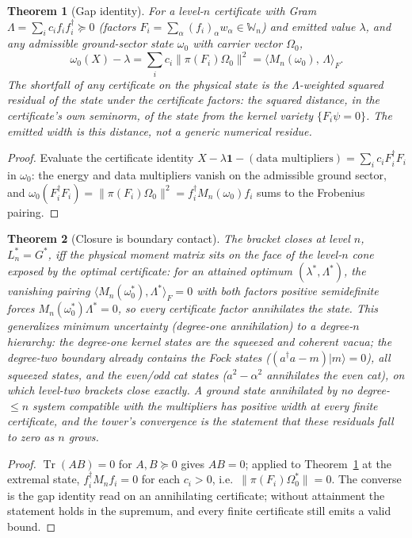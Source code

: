 \documentclass[11pt]{article}
\newtheorem{theorem}{Theorem}[section]
\theoremstyle{definition}
\theoremstyle{remark}
\newcommand{\Tr}{\operatorname{Tr}}
\newcommand{\W}{\mathbb{W}}
\begin{document}
\begin{theorem}[Gap identity]\label{thm:gapid}
For a level-$n$ certificate with Gram $\Lambda = \sum_i c_i f_i f_i^\dagger
\succeq 0$ (factors $F_i = \sum_\alpha (f_i)_\alpha w_\alpha \in \W_n$) and
emitted value $\lambda$, and any admissible ground-sector state $\omega_0$
with carrier vector $\Omega_0$,
\[
\omega_0(X) - \lambda = \sum_i c_i \|\pi(F_i)\Omega_0\|^2
= \langle M_n(\omega_0),\, \Lambda\rangle_F .
\]
The shortfall of any certificate on the physical state is the
$\Lambda$-weighted squared residual of the state under the certificate
factors: the squared distance, \emph{in the certificate's own seminorm}, of
the state from the kernel variety $\{F_i\psi = 0\}$.  The emitted width is
this distance, not a generic numerical residue.
\end{theorem}
\begin{proof}
Evaluate the certificate identity $X - \lambda\mathbf 1 - (\text{data
multipliers}) = \sum_i c_i F_i^\dagger F_i$ in $\omega_0$: the energy and
data multipliers vanish on the admissible ground sector, and
$\omega_0(F_i^\dagger F_i) = \|\pi(F_i)\Omega_0\|^2 = f_i^\dagger
M_n(\omega_0) f_i$ sums to the Frobenius pairing.
\end{proof}

\begin{theorem}[Closure is boundary contact]\label{thm:closure}
The bracket closes at level $n$, $L_n^* = G^*$, iff the physical moment
matrix sits on the face of the level-$n$ cone exposed by the optimal
certificate: for an attained optimum $(\lambda^*, \Lambda^*)$, the vanishing
pairing $\langle M_n(\omega_0^*), \Lambda^*\rangle_F = 0$ with both factors
positive semidefinite forces $M_n(\omega_0^*)\Lambda^* = 0$, so every
certificate factor annihilates the state.  This generalizes minimum
uncertainty (degree-one annihilation) to a degree-$n$ hierarchy: the
degree-one kernel states are the squeezed and coherent vacua; the
degree-two boundary already contains the Fock states ($(a^\dagger a -
m)|m\rangle = 0$), all squeezed states, and the even/odd cat states ($a^2 -
\alpha^2$ annihilates the even cat), on which level-two brackets close
exactly.  A ground state annihilated by no degree-$\le n$ system compatible
with the multipliers has positive width at every finite certificate, and
the tower's convergence is the statement that these residuals fall to zero
as $n$ grows.
\end{theorem}
\begin{proof}
$\Tr(AB) = 0$ for $A, B \succeq 0$ gives $AB = 0$; applied to
Theorem~\ref{thm:gapid} at the extremal state, $f_i^\dagger M_n f_i = 0$ for
each $c_i > 0$, i.e.\ $\|\pi(F_i)\Omega_0^*\| = 0$.  The converse is the gap
identity read on an annihilating certificate; without attainment the
statement holds in the supremum, and every finite certificate still emits a
valid bound.
\end{proof}
\end{document}
